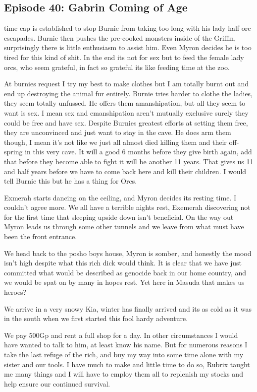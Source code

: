 \subsection{Episode 40: Gabrin Coming of Age}

 time cap is established to stop Burnie from taking too long with his lady half orc escapades. Burnie then pushes the pre-cooked monsters inside of the Griffin, surprisingly there is little enthusiasm to assist him. Even Myron decides he is too tired for this kind of shit. In the end its not for sex but to feed the female lady orcs, who seem grateful, in fact so grateful its like feeding time at the zoo.\medskip

At burnies request I try my best to make clothes but I am totally burnt out and end up destroying the animal fur entirely. Burnie tries harder to clothe the ladies, they seem totally unfussed. He offers them amanshipation, but all they seem to want is sex. I mean sex and emanshipation aren't mutually exclusive surely they could be free and have sex. Despite Burnies greatest efforts at setting them free, they are unconvinced and just want to stay in the cave. He does arm them though, I mean it's not like we just all almost died killing them and their off-spring in this very cave. It will a good 6 months before they give birth again, add that before they become able to fight it will be another 11 years. That gives us 11 and half years before we have to come back here and kill their children. I would tell Burnie this but he has a thing for Orcs.\medskip

Exmerah starts dancing on the ceiling, and Myron decides its resting time. I couldn't agree more. We all have a terrible nights rest, Exemerah discovering not for the first time that sleeping upside down isn't beneficial. On the way out Myron leads us through some other tunnels and we leave from what must have been the front entrance.\medskip

We head back to the posho boys house, Myron is somber, and honestly the mood isn't high despite what this rich dick would think. It is clear that we have just committed what would be described as genocide back in our home country, and we would be spat on by many in hopes rest. Yet here in Masuda that makes us heroes?\medskip

We arrive in a very snowy Kia, winter has finally arrived and its as cold as it was in the south when we first started this fool hardy adventure.\medskip

We pay 500Gp and rent a full shop for a day. In other circumstances I would have wanted to talk to him, at least know his name. But for numerous reasons I take the last refuge of the rich, and buy my way into some time alone with my sister and our tools. I have much to make and little time to do so, Rubrix taught me many things and I will have to employ them all to replenish my stocks and help ensure our continued survival.\medskip

